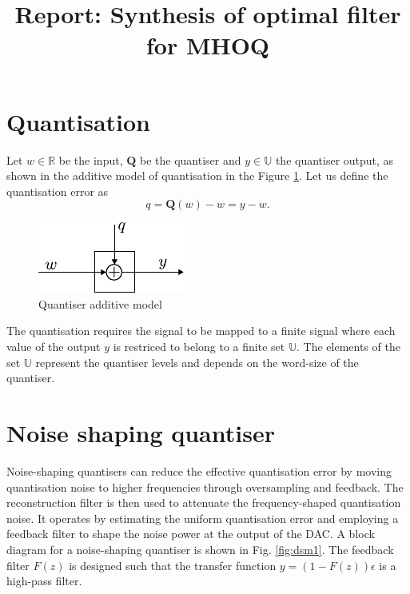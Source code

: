 \documentclass[a4paper]{article}
\title{Report: Synthesis of optimal filter for MHOQ}
\begin{document}
\newpage
\maketitle
\tableofcontents

\section{Quantisation}
Let $w \in \mathbb{R}$ be the input, $\mathbf{Q}$ be the quantiser and $y \in \mathbb{U}$ the quantiser output, as shown in the additive model of quantisation in the Figure \ref{fig:quan_add_model}.  Let us define the quantisation error as 
\begin{equation}
	q = \mathbf{Q}(w) - w= y -w.
	\label{eq:error}
\end{equation}
\begin{figure}
    \centering
    \includegraphics[scale = 1]{figures/quantizer_additive_model.pdf}
    \caption{Quantiser additive model}
    \label{fig:quan_add_model}
\end{figure}
The quantisation requires the signal to be mapped to a finite signal where each value of the output $y$ is restriced to belong to a finite set $\mathbb{U}$. The elements of the set $\mathbb{U}$ represent the quantiser levels and depends on the word-size of the quantiser. 

\section{Noise shaping quantiser}
Noise-shaping quantisers can reduce the effective quantisation error by moving quantisation noise to higher 
frequencies through oversampling and feedback.  The reconstruction filter is then used to attenuate the 
frequency-shaped quantisation noise. It operates by estimating the uniform quantisation error and employing a 
feedback filter to shape the noise power at the output of the DAC. A block diagram for a noise-shaping quantiser 
is shown in Fig. \ref{fig:dsm1}. The feedback filter $F(z)$ is designed such that the transfer 
function $y = (1 - F(z)) \epsilon$ is a high-pass filter.
\end{document}
